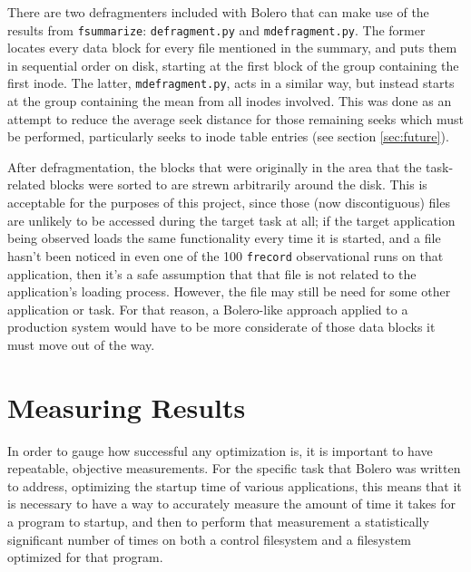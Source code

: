 \documentclass[10pt,twocolumn,letterpaper]{article}
\begin{document}
There are two defragmenters included with Bolero that can make use of the results from \texttt{fsummarize}:
\texttt{defragment.py} and \texttt{mdefragment.py}. The former locates every data block for every file mentioned
in the summary, and puts them in sequential order on disk, starting at the first block of the group containing
the first inode. The latter, \texttt{mdefragment.py}, acts in a similar way, but instead starts at the group containing the mean from all inodes involved. This was done as an attempt to reduce the average seek distance for
those remaining seeks which must be performed, particularly seeks to inode table entries (see section \ref{sec:future}).

After defragmentation, the blocks that were originally in the area that the task-related blocks were sorted to
are strewn arbitrarily around the disk. This is acceptable for the purposes of this project, since those (now
discontiguous) files are unlikely to be accessed during the target task at all; if the target application being observed loads the same functionality every time it is started, and a file hasn't been noticed
in even one of the 100 \texttt{frecord} observational runs on that application, then it's a safe assumption that that file is not related to the application's loading process. However, the file may still be need for some other application or task. For that reason, a Bolero-like approach applied to a production system would have to be more considerate of those data blocks it must move out of the way.

\section{Measuring Results}\label{sec:results}

In order to gauge how successful any optimization is, it is important to have
repeatable, objective measurements. For the specific task that Bolero was written
to address, optimizing the startup time of various applications, this means that it
is necessary to have a way to accurately measure the amount of time it takes for
a program to startup, and then to perform that measurement a statistically significant
number of times on both a control filesystem and a filesystem optimized for that program.
\end{document}
